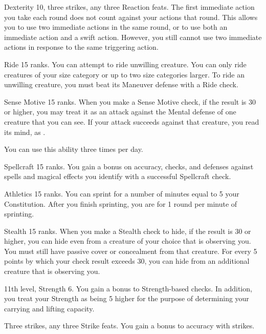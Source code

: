 \featpres Dexterity 10, three strikes, any three Reaction feats.
\featben The first immediate action you take each round does not count against your actions that round.
This allows you to use two immediate actions in the same round, or to use both an immediate action and a swift action.
However, you still cannot use two immediate actions in response to the same triggering action.

\featpre Ride 15 ranks.
\featben You can attempt to ride unwilling creature.
You can only ride creatures of your size category or up to two size categories larger.
To ride an unwilling creature, you must beat its Maneuver defense with a Ride check.

\featpre Sense Motive 15 ranks.
\featben When you make a Sense Motive check, if the result is 30 or higher, you may treat it as an attack against the Mental defense of one creature that you can see.
If your attack succeeds against that creature, you read its mind, as .

You can use this ability three times per day.

\featpre Spellcraft 15 ranks.
\featben You gain a  bonus on accuracy, checks, and defenses against spells and magical effects you identify with a successful Spellcraft check.

\featpre Athletics 15 ranks.
\featben You can sprint for a number of minutes equal to 5 \add your Constitution.
After you finish sprinting, you are \fatigued for 1 round per minute of sprinting.

\featpre Stealth 15 ranks.
\featben When you make a Stealth check to hide, if the result is 30 or higher, you can hide even from a creature of your choice that is observing you.
You must still have passive cover or concealment from that creature.
For every 5 points by which your check result exceeds 30, you can hide from an additional creature that is observing you.

\featpres 11th level, Strength 6.
\featben You gain a  bonus to Strength-based checks.
In addition, you treat your Strength as being 5 higher for the purpose of determining your carrying and lifting capacity.

\featpres Three strikes, any three Strike feats.
\featben You gain a  bonus to accuracy with strikes.

